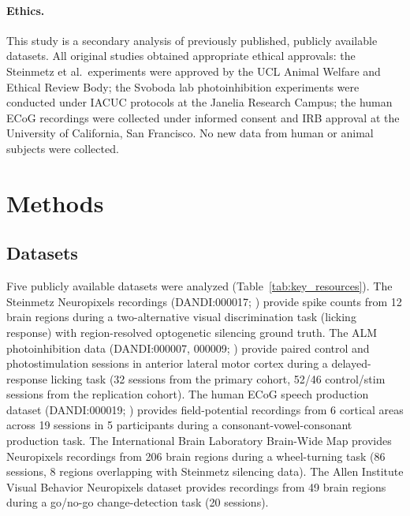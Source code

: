 \documentclass[9pt,lineno]{elife}
\begin{document}
\paragraph{Ethics.} This study is a secondary analysis of previously published, publicly available datasets. All original studies obtained appropriate ethical approvals: the Steinmetz et al.\ experiments were approved by the UCL Animal Welfare and Ethical Review Body; the Svoboda lab photoinhibition experiments were conducted under IACUC protocols at the Janelia Research Campus; the human ECoG recordings were collected under informed consent and IRB approval at the University of California, San Francisco. No new data from human or animal subjects were collected.


\section{Methods}

\subsection{Datasets}
\label{sec:datasets}

Five publicly available datasets were analyzed (Table~\ref{tab:key_resources}). The Steinmetz Neuropixels recordings (DANDI:000017; \citealp{steinmetz2019distributed, zatkahaas2021}) provide spike counts from 12 brain regions during a two-alternative visual discrimination task (licking response) with region-resolved optogenetic silencing ground truth. The ALM photoinhibition data (DANDI:000007, 000009; \citealp{svoboda_alm}) provide paired control and photostimulation sessions in anterior lateral motor cortex during a delayed-response licking task (32 sessions from the primary cohort, 52/46 control/stim sessions from the replication cohort). The human ECoG speech production dataset (DANDI:000019; \citealp{dandi000019}) provides field-potential recordings from 6 cortical areas across 19 sessions in 5 participants during a consonant-vowel-consonant production task. The International Brain Laboratory Brain-Wide Map \citep{ibl2025brainwide} provides Neuropixels recordings from 206 brain regions during a wheel-turning task (86 sessions, 8 regions overlapping with Steinmetz silencing data). The Allen Institute Visual Behavior Neuropixels dataset \citep{siegle2021survey} provides recordings from 49 brain regions during a go/no-go change-detection task (20 sessions).
\end{document}
